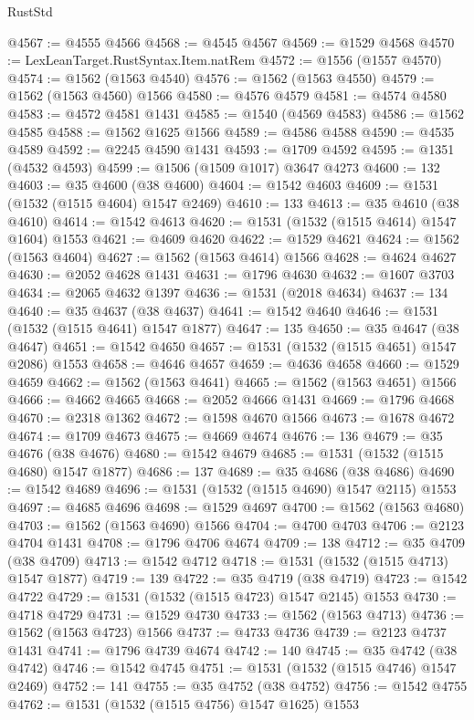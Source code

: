 \begin{lexlean}{RustStd}
\begin{coremodule}
{\begin{coremodule}
{{{{{{{{{{{{{{{{{{{{{{{{{{{{{{{{@4567 := @4555 @4566
@4568 := @4545 @4567
@4569 := @1529 @4568
@4570 := LexLeanTarget.RustSyntax.Item.natRem
@4572 := @1556 (@1557 @4570)
@4574 := @1562 (@1563 @4540)
@4576 := @1562 (@1563 @4550)
@4579 := @1562 (@1563 @4560) @1566
@4580 := @4576 @4579
@4581 := @4574 @4580
@4583 := @4572 @4581 @1431
@4585 := @1540 (@4569 @4583)
@4586 := @1562 @4585
@4588 := @1562 @1625 @1566
@4589 := @4586 @4588
@4590 := @4535 @4589
@4592 := @2245 @4590 @1431
@4593 := @1709 @4592
@4595 := @1351 (@4532 @4593)
@4599 := @1506 (@1509 @1017) @3647 @4273
@4600 := 132
@4603 := @35 @4600 (@38 @4600)
@4604 := @1542 @4603
@4609 := @1531 (@1532 (@1515 @4604) @1547 @2469)
@4610 := 133
@4613 := @35 @4610 (@38 @4610)
@4614 := @1542 @4613
@4620 := @1531 (@1532 (@1515 @4614) @1547 @1604) @1553
@4621 := @4609 @4620
@4622 := @1529 @4621
@4624 := @1562 (@1563 @4604)
@4627 := @1562 (@1563 @4614) @1566
@4628 := @4624 @4627
@4630 := @2052 @4628 @1431
@4631 := @1796 @4630
@4632 := @1607 @3703
@4634 := @2065 @4632 @1397
@4636 := @1531 (@2018 @4634)
@4637 := 134
@4640 := @35 @4637 (@38 @4637)
@4641 := @1542 @4640
@4646 := @1531 (@1532 (@1515 @4641) @1547 @1877)
@4647 := 135
@4650 := @35 @4647 (@38 @4647)
@4651 := @1542 @4650
@4657 := @1531 (@1532 (@1515 @4651) @1547 @2086) @1553
@4658 := @4646 @4657
@4659 := @4636 @4658
@4660 := @1529 @4659
@4662 := @1562 (@1563 @4641)
@4665 := @1562 (@1563 @4651) @1566
@4666 := @4662 @4665
@4668 := @2052 @4666 @1431
@4669 := @1796 @4668
@4670 := @2318 @1362
@4672 := @1598 @4670 @1566
@4673 := @1678 @4672
@4674 := @1709 @4673
@4675 := @4669 @4674
@4676 := 136
@4679 := @35 @4676 (@38 @4676)
@4680 := @1542 @4679
@4685 := @1531 (@1532 (@1515 @4680) @1547 @1877)
@4686 := 137
@4689 := @35 @4686 (@38 @4686)
@4690 := @1542 @4689
@4696 := @1531 (@1532 (@1515 @4690) @1547 @2115) @1553
@4697 := @4685 @4696
@4698 := @1529 @4697
@4700 := @1562 (@1563 @4680)
@4703 := @1562 (@1563 @4690) @1566
@4704 := @4700 @4703
@4706 := @2123 @4704 @1431
@4708 := @1796 @4706 @4674
@4709 := 138
@4712 := @35 @4709 (@38 @4709)
@4713 := @1542 @4712
@4718 := @1531 (@1532 (@1515 @4713) @1547 @1877)
@4719 := 139
@4722 := @35 @4719 (@38 @4719)
@4723 := @1542 @4722
@4729 := @1531 (@1532 (@1515 @4723) @1547 @2145) @1553
@4730 := @4718 @4729
@4731 := @1529 @4730
@4733 := @1562 (@1563 @4713)
@4736 := @1562 (@1563 @4723) @1566
@4737 := @4733 @4736
@4739 := @2123 @4737 @1431
@4741 := @1796 @4739 @4674
@4742 := 140
@4745 := @35 @4742 (@38 @4742)
@4746 := @1542 @4745
@4751 := @1531 (@1532 (@1515 @4746) @1547 @2469)
@4752 := 141
@4755 := @35 @4752 (@38 @4752)
@4756 := @1542 @4755
@4762 := @1531 (@1532 (@1515 @4756) @1547 @1625) @1553
}}}}}}}}}}}}}}}}}}}}}}}}}}}}}}}}
\end{coremodule}}
\end{coremodule}
\end{lexlean}
